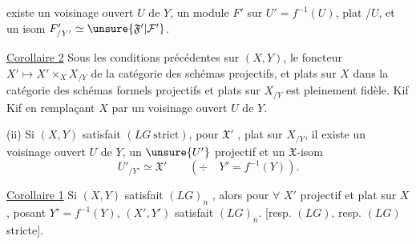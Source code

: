 
existe un voisinage ouvert $U$ de $Y$, 
un module $F'$ sur $U'=f^{-1}(U)$, plat /$U$, et un
isom $F'_{/Y'}\simeq\unsure{\mathfrak F'|\mathcal F'}$.

\uline{Corollaire 2} Sous les conditions précédentes sur
$(X,Y)$, 
le foncteur $X'\longmapsto X'\times_X X_{/Y}$
de la catégorie des schémas  projectifs,
et plats sur $X$ dans la catégorie des
schémas formels projectifs et plats sur $X_{/Y}$
est pleinement fidèle. Kif Kif en
remplaçant $X$ par un voisinage ouvert $U$ de $Y$.


(ii) Si $(X,Y)$ satisfait $(LG\ \text{strict})$, pour
 $\mathfrak X'$ 
, plat sur $X_{/Y}$, il existe
un voisinage ouvert $U$ de $Y$,  un
$\unsure{U'}$ projectif 
 et un
$\mathfrak X$-isom
\[
U'_{/Y'}\simeq\mathfrak X'\qquad (\div\quad Y'=f^{-1}(Y)).
\]

\uline{Corollaire 1} 
 Si $(X,Y)$ satisfait $(LG)_n$
,
alors pour $\forall$ $X'$ projectif et plat sur $X$,
posant  $Y'=f^{-1}(Y)$,
$(X',Y')$ satisfait $(LG)_n$.
[resp. $(LG)$, resp. $(LG)$ stricte].

